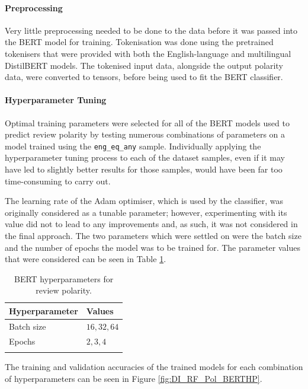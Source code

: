 \paragraph{Preprocessing}

Very little preprocessing needed to be done to the data before it was passed into the BERT model for training. Tokenisation was done using the pretrained tokenisers that were provided with both the English-language and multilingual DistilBERT models. The tokenised input data, alongside the output polarity data, were converted to tensors, before being used to fit the BERT classifier.

\paragraph{Hyperparameter Tuning}

Optimal training parameters were selected for all of the BERT models used to predict review polarity by testing numerous combinations of parameters on a model trained using the \texttt{eng\_eq\_any} sample. Individually applying the hyperparameter tuning process to each of the dataset samples, even if it may have led to slightly better results for those samples, would have been far too time-consuming to carry out.

The learning rate of the Adam optimiser, which is used by the classifier, was originally considered as a tunable parameter; however, experimenting with its value did not to lead to any improvements and, as such, it was not considered in the final approach. The two parameters which were settled on were the batch size and the number of epochs the model was to be trained for. The parameter values that were considered can be seen in Table \ref{tab:DI_RF_Pol_BERTHP}.

\begin{table}[ht]
    \centering
    \begin{tabular}{l l}
        \toprule
        \textbf{Hyperparameter} & \textbf{Values}\\\midrule
        Batch size & $16, 32, 64$\\
        Epochs & $2, 3, 4$\\
        \bottomrule\\
    \end{tabular}
    \caption{BERT hyperparameters for review polarity.}
    \label{tab:DI_RF_Pol_BERTHP}
\end{table}

The training and validation accuracies of the trained models for each combination of hyperparameters can be seen in Figure \ref{fig:DI_RF_Pol_BERTHP}.

